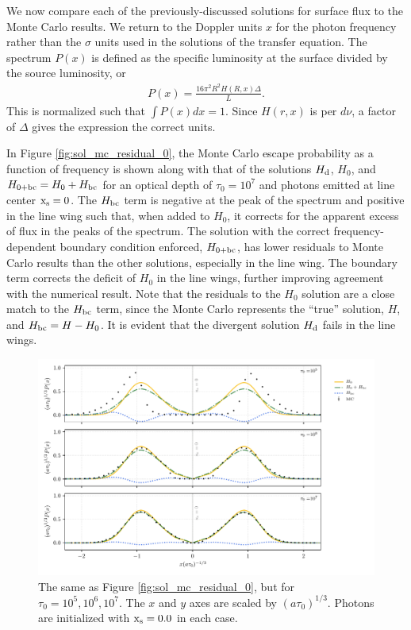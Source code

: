 \documentclass{aastex63}
\newcommand{\be}{\begin{eqnarray}}
\newcommand{\ee}{\end{eqnarray}}
\begin{document}
We now compare each of the previously-discussed solutions for surface flux to the Monte Carlo results. We return to the Doppler units $x$ for the photon frequency rather than the $\sigma$ units used in the solutions of the transfer equation. The spectrum $P(x)$ is defined as the specific luminosity at the surface divided by the source luminosity, or
\be
P(x) = \frac{16\pi^2R^2H(R, x)\Delta}{L}.
\ee
This is normalized such that $\int P(x)dx = 1$. Since $H(r, x)$ is per $d\nu$, a factor of $\Delta$ gives the expression the correct units. 

In Figure \ref{fig:sol_mc_residual_0}, the Monte Carlo escape probability as a function of frequency is shown along with that of the solutions $H_{\rm d}$, $H_0$, and $H_{\rm 0 + bc} = H_0 + H_{\rm bc}$ for an optical depth of $\tau_0 = 10^7$ and photons emitted at line center $\rm x_s = 0$.  The $H_{\rm bc}$ term is negative at the peak of the spectrum and positive in the line wing such that, when added to $H_0$, it corrects for the apparent excess of flux in the peaks of the spectrum. The solution with the correct frequency-dependent boundary condition enforced, $H_{0 + \rm bc}$, has lower residuals to Monte Carlo results than the other solutions, especially in the line wing. The boundary term corrects the deficit of $H_0$ in the line wings, further improving agreement with the numerical result. Note that the residuals to the $H_0$ solution are a close match to the $H_{\rm bc}$ term, since the Monte Carlo represents the ``true'' solution, $H$, and $H_{\rm bc} = H - H_0$. It is evident that the divergent solution $H_{\rm d}$ fails in the line wings.

 \begin{figure}
    \centering
    \includegraphics{tau_threepanel.pdf}
    \caption{The same as Figure \ref{fig:sol_mc_residual_0}, but for $\tau_0 = 10^5, 10^6, 10^7$. The $x$ and $y$ axes are scaled by $(a\tau_0)^{1/3}$. Photons are initialized with $\rm x_s = 0.0$ in each case.} 
    \label{fig:sol_mc_tau}
\end{figure}
\end{document}
